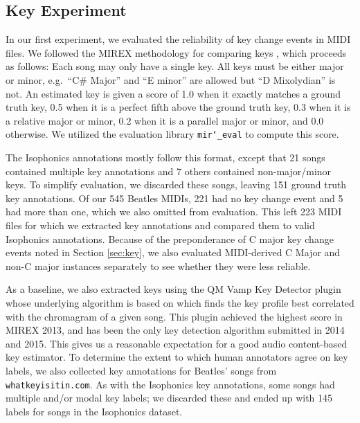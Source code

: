 \subsection{Key Experiment}

In our first experiment, we evaluated the reliability of key change events in MIDI files.
We followed the MIREX methodology for comparing keys \cite{ehmann2016mirex}, which proceeds as follows:
Each song may only have a single key.
All keys must be either major or minor, e.g.\ ``C\# Major'' and ``E minor'' are allowed but ``D Mixolydian'' is not.
An estimated key is given a score of 1.0 when it exactly matches a ground truth key, 0.5 when it is a perfect fifth above the ground truth key, 0.3 when it is a relative major or minor, 0.2 when it is a parallel major or minor, and 0.0 otherwise.
We utilized the evaluation library \texttt{mir\char`_eval} \cite{raffel2014mir_eval} to compute this score.

The Isophonics annotations mostly follow this format, except that 21 songs contained multiple key annotations and 7 others contained non-major/minor keys.
To simplify evaluation, we discarded these songs, leaving 151 ground truth key annotations.
Of our 545 Beatles MIDIs, 221 had no key change event and 5 had more than one, which we also omitted from evaluation.
This left 223 MIDI files for which we extracted key annotations and compared them to valid Isophonics annotations.
Because of the preponderance of C major key change events noted in Section \ref{sec:key}, we also evaluated MIDI-derived C Major and non-C major instances separately to see whether they were less reliable.

As a baseline, we also extracted keys using the QM Vamp Key Detector plugin \cite{cannam2015mirex} whose underlying algorithm is based on \cite{noland2007signal} which finds the key profile best correlated with the chromagram of a given song.
This plugin achieved the highest score in MIREX 2013, and has been the only key detection algorithm submitted in 2014 and 2015.
This gives us a reasonable expectation for a good audio content-based key estimator.
To determine the extent to which human annotators agree on key labels, we also collected key annotations for Beatles' songs from \texttt{whatkeyisitin.com}.
As with the Isophonics key annotations, some songs had multiple and/or modal key labels; we discarded these and ended up with 145 labels for songs in the Isophonics dataset.

